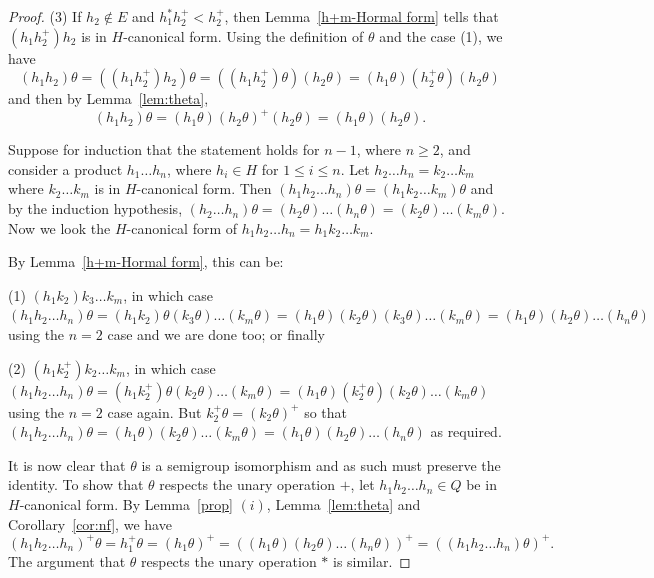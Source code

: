\documentclass[10pt,a4paper]{amsart}
\begin{document}
\begin{proof}
(3)  If $h_2 \notin E$ and  $h_1^* h_2^+< h_2^+$,  then  Lemma~\ref{h+m-Hormal form} tells that  $(h_1h_2^+)h_2$ is in $H$-canonical form.  Using  the definition of $\theta$ and the case (1),   we have  \[(h_1h_2)\theta = ((h_1h_2^+)h_2)\theta =((h_1h_2^+)\theta )(h_2\theta)=(h_1\theta)(h_2^+\theta)(h_2\theta)\]
and then 
by Lemma~\ref{lem:theta},
\[(h_1h_2)\theta=(h_1\theta)(h_2\theta)^+(h_2\theta)=(h_1\theta)(h_2\theta).\]

Suppose for induction that  the statement holds  for $n-1$, where $n\geq 2$,  and consider a product
$h_1\dots h_n$, where $h_i\in H$ for $1\leq i\leq n$. 
Let $h_2\dots h_n = k_2\dots k_m$ where $k_2\dots k_m$  is in $H$-canonical form. Then $(h_1h_2\dots h_n)\theta = (h_1k_2\dots k_m)\theta$ and by the induction hypothesis,  $(h_2\dots h_n)\theta=(h_2\theta)\dots (h_n\theta)= (k_2\theta) \dots (k_m\theta)$. Now we look the $H$-canonical form of $h_1h_2\dots h_n=h_1k_2\dots k_m$. 
 
By Lemma~\ref{h+m-Hormal form}, this can be:

(1) $(h_1k_2)k_3\dots k_m$, in which case  
$(h_1h_2\dots h_n)\theta=  (h_1k_2)\theta (k_3\theta) \dots (k_m\theta)=(h_1\theta)( k_2\theta) (k_3\theta) \dots (k_m\theta)=(h_1\theta)(h_2\theta) \dots (h_n\theta)$ using the  $n=2$ case  and we are done too; or finally


(2) $(h_1k_2^+)k_2\dots k_m$, in which case 
$(h_1h_2\dots h_n)\theta=(h_1k_2^+)\theta (k_2\theta )\dots( k_m\theta)=(h_1\theta)(k_2^+\theta) (k_2\theta )\dots( k_m\theta)$ using the  $n=2$ case again. But $k_2^+\theta =(k_2\theta)^+$ so that $(h_1h_2\dots h_n)\theta= (h_1\theta) (k_2\theta )\dots( k_m\theta)=(h_1\theta)(h_2\theta) \dots (h_n\theta)$ as required.

It is now clear that $\theta$ is a semigroup isomorphism and as such  must preserve the identity. To show that $\theta$ respects the unary operation $+$, let $h_1h_2\dots h_n\in Q$ be in $H$-canonical form. By Lemma~\ref{prop} $(i)$, Lemma~\ref{lem:theta} and Corollary~\ref{cor:nf}, we have
\[
(h_1h_2\dots h_n)^+\theta= h_1^+\theta=(h_1\theta)^+=((h_1\theta)( h_2\theta) \dots (h_n\theta))^+= ((h_1h_2\dots h_n)\theta)^+.
\]
The argument that  $\theta$ respects the unary operation $*$ is similar.
\end{proof}
\end{document}
